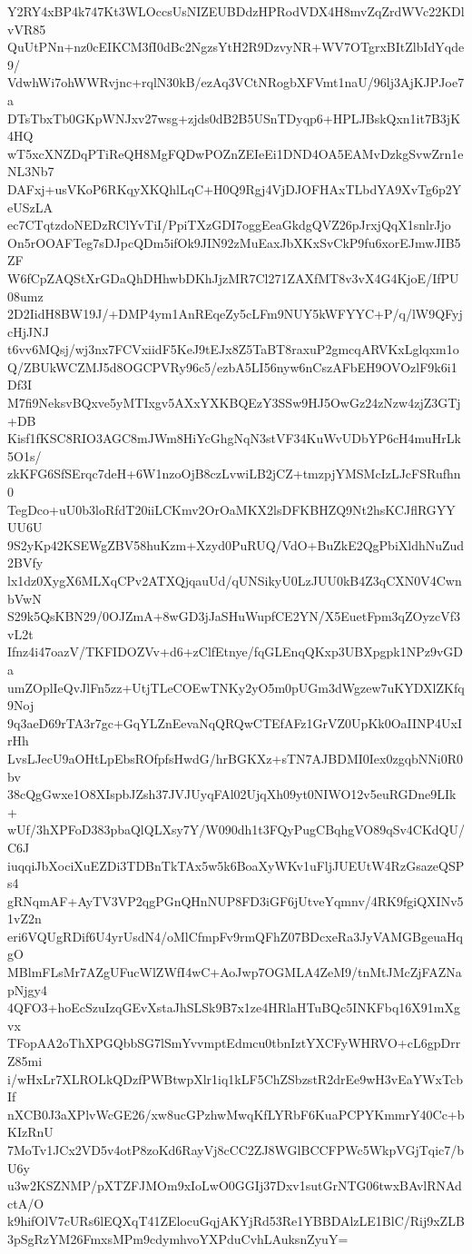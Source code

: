 Y2RY4xBP4k747Kt3WLOccsUsNIZEUBDdzHPRodVDX4H8mvZqZrdWVc22KDlvVR85
QuUtPNn+nz0cEIKCM3fI0dBc2NgzsYtH2R9DzvyNR+WV7OTgrxBItZlbIdYqde9/
VdwhWi7ohWWRvjnc+rqlN30kB/ezAq3VCtNRogbXFVmt1naU/96lj3AjKJPJoe7a
DTsTbxTb0GKpWNJxv27wsg+zjds0dB2B5USnTDyqp6+HPLJBskQxn1it7B3jK4HQ
wT5xcXNZDqPTiReQH8MgFQDwPOZnZEIeEi1DND4OA5EAMvDzkgSvwZrn1eNL3Nb7
DAFxj+usVKoP6RKqyXKQhlLqC+H0Q9Rgj4VjDJOFHAxTLbdYA9XvTg6p2YeUSzLA
ec7CTqtzdoNEDzRClYvTiI/PpiTXzGDI7oggEeaGkdgQVZ26pJrxjQqX1snlrJjo
On5rOOAFTeg7sDJpcQDm5ifOk9JIN92zMuEaxJbXKxSvCkP9fu6xorEJmwJIB5ZF
W6fCpZAQStXrGDaQhDHhwbDKhJjzMR7Cl271ZAXfMT8v3vX4G4KjoE/IfPU08umz
2D2IidH8BW19J/+DMP4ym1AnREqeZy5cLFm9NUY5kWFYYC+P/q/lW9QFyjcHjJNJ
t6vv6MQsj/wj3nx7FCVxiidF5KeJ9tEJx8Z5TaBT8raxuP2gmcqARVKxLglqxm1o
Q/ZBUkWCZMJ5d8OGCPVRy96c5/ezbA5LI56nyw6nCszAFbEH9OVOzlF9k6i1Df3I
M7fi9NeksvBQxve5yMTIxgv5AXxYXKBQEzY3SSw9HJ5OwGz24zNzw4zjZ3GTj+DB
Kisf1fKSC8RIO3AGC8mJWm8HiYcGhgNqN3stVF34KuWvUDbYP6cH4muHrLk5O1s/
zkKFG6SfSErqc7deH+6W1nzoOjB8czLvwiLB2jCZ+tmzpjYMSMcIzLJcFSRufhn0
TegDco+uU0b3loRfdT20iiLCKmv2OrOaMKX2lsDFKBHZQ9Nt2hsKCJflRGYYUU6U
9S2yKp42KSEWgZBV58huKzm+Xzyd0PuRUQ/VdO+BuZkE2QgPbiXldhNuZud2BVfy
lx1dz0XygX6MLXqCPv2ATXQjqauUd/qUNSikyU0LzJUU0kB4Z3qCXN0V4CwnbVwN
S29k5QsKBN29/0OJZmA+8wGD3jJaSHuWupfCE2YN/X5EuetFpm3qZOyzcVf3vL2t
Ifnz4i47oazV/TKFIDOZVv+d6+zClfEtnye/fqGLEnqQKxp3UBXpgpk1NPz9vGDa
umZOplIeQvJlFn5zz+UtjTLeCOEwTNKy2yO5m0pUGm3dWgzew7uKYDXlZKfq9Noj
9q3aeD69rTA3r7gc+GqYLZnEevaNqQRQwCTEfAFz1GrVZ0UpKk0OaIINP4UxIrHh
LvsLJecU9aOHtLpEbsROfpfsHwdG/hrBGKXz+sTN7AJBDMI0Iex0zgqbNNi0R0bv
38cQgGwxe1O8XIspbJZsh37JVJUyqFAl02UjqXh09yt0NIWO12v5euRGDne9LIk+
wUf/3hXPFoD383pbaQlQLXsy7Y/W090dh1t3FQyPugCBqhgVO89qSv4CKdQU/C6J
iuqqiJbXociXuEZDi3TDBnTkTAx5w5k6BoaXyWKv1uFljJUEUtW4RzGsazeQSPs4
gRNqmAF+AyTV3VP2qgPGnQHnNUP8FD3iGF6jUtveYqmnv/4RK9fgiQXINv51vZ2n
eri6VQUgRDif6U4yrUsdN4/oMlCfmpFv9rmQFhZ07BDcxeRa3JyVAMGBgeuaHqgO
MBlmFLsMr7AZgUFucWlZWfI4wC+AoJwp7OGMLA4ZeM9/tnMtJMcZjFAZNapNjgy4
4QFO3+hoEcSzuIzqGEvXstaJhSLSk9B7x1ze4HRlaHTuBQc5INKFbq16X91mXgvx
TFopAA2oThXPGQbbSG7lSmYvvmptEdmcu0tbnIztYXCFyWHRVO+cL6gpDrrZ85mi
i/wHxLr7XLROLkQDzfPWBtwpXlr1iq1kLF5ChZSbzstR2drEe9wH3vEaYWxTcbIf
nXCB0J3aXPlvWcGE26/xw8ucGPzhwMwqKfLYRbF6KuaPCPYKmmrY40Cc+bKIzRnU
7MoTv1JCx2VD5v4otP8zoKd6RayVj8cCC2ZJ8WGlBCCFPWc5WkpVGjTqic7/bU6y
u3w2KSZNMP/pXTZFJMOm9xIoLwO0GGIj37Dxv1sutGrNTG06twxBAvlRNAdctA/O
k9hifOlV7cURs6lEQXqT41ZElocuGqjAKYjRd53Re1YBBDAlzLE1BlC/Rij9xZLB
3pSgRzYM26FmxsMPm9cdymhvoYXPduCvhLAuksnZyuY=

